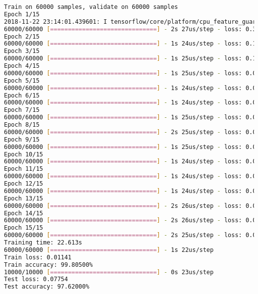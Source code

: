 \begin{lstlisting}[language=bash]
Train on 60000 samples, validate on 60000 samples
Epoch 1/15
2018-11-22 23:14:01.439601: I tensorflow/core/platform/cpu_feature_guard.cc:141] Your CPU supports instructions that this TensorFlow binary was not compiled to use: AVX2 FMA
60000/60000 [==============================] - 2s 27us/step - loss: 0.3603 - acc: 0.9007 - val_loss: 0.1898 - val_acc: 0.9472
Epoch 2/15
60000/60000 [==============================] - 1s 24us/step - loss: 0.1674 - acc: 0.9526 - val_loss: 0.1290 - val_acc: 0.9639
Epoch 3/15
60000/60000 [==============================] - 1s 25us/step - loss: 0.1205 - acc: 0.9656 - val_loss: 0.0996 - val_acc: 0.9711
Epoch 4/15
60000/60000 [==============================] - 1s 25us/step - loss: 0.0929 - acc: 0.9736 - val_loss: 0.0774 - val_acc: 0.9777
Epoch 5/15
60000/60000 [==============================] - 1s 24us/step - loss: 0.0750 - acc: 0.9784 - val_loss: 0.0606 - val_acc: 0.9826
Epoch 6/15
60000/60000 [==============================] - 1s 24us/step - loss: 0.0622 - acc: 0.9819 - val_loss: 0.0499 - val_acc: 0.9866
Epoch 7/15
60000/60000 [==============================] - 1s 25us/step - loss: 0.0524 - acc: 0.9853 - val_loss: 0.0417 - val_acc: 0.9884
Epoch 8/15
60000/60000 [==============================] - 2s 25us/step - loss: 0.0439 - acc: 0.9877 - val_loss: 0.0369 - val_acc: 0.9902
Epoch 9/15
60000/60000 [==============================] - 1s 25us/step - loss: 0.0375 - acc: 0.9895 - val_loss: 0.0288 - val_acc: 0.9930
Epoch 10/15
60000/60000 [==============================] - 1s 24us/step - loss: 0.0326 - acc: 0.9911 - val_loss: 0.0243 - val_acc: 0.9942
Epoch 11/15
60000/60000 [==============================] - 1s 24us/step - loss: 0.0271 - acc: 0.9927 - val_loss: 0.0218 - val_acc: 0.9952
Epoch 12/15
60000/60000 [==============================] - 1s 24us/step - loss: 0.0240 - acc: 0.9939 - val_loss: 0.0168 - val_acc: 0.9963
Epoch 13/15
60000/60000 [==============================] - 2s 26us/step - loss: 0.0209 - acc: 0.9946 - val_loss: 0.0161 - val_acc: 0.9966
Epoch 14/15
60000/60000 [==============================] - 2s 26us/step - loss: 0.0174 - acc: 0.9958 - val_loss: 0.0128 - val_acc: 0.9973
Epoch 15/15
60000/60000 [==============================] - 2s 25us/step - loss: 0.0149 - acc: 0.9965 - val_loss: 0.0114 - val_acc: 0.9980
Training time: 22.613s
60000/60000 [==============================] - 1s 22us/step
Train loss: 0.01141
Train accuracy: 99.80500%
10000/10000 [==============================] - 0s 23us/step
Test loss: 0.07754
Test accuracy: 97.62000%

\end{lstlisting}

